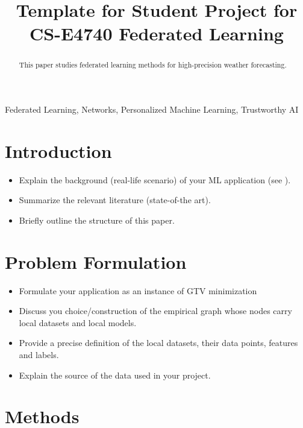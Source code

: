 \documentclass{article}
\title{Template for Student Project for \\ 
	CS-E4740 Federated Learning}
\begin{document}
%
\maketitle
%
\begin{abstract}
This paper studies federated learning methods for high-precision weather forecasting. 
\end{abstract}
%
\begin{keywords}
Federated Learning, Networks, Personalized Machine Learning, Trustworthy AI 
\end{keywords}
%
\section{Introduction}
\label{sec:intro}
\begin{itemize}
\item Explain the background (real-life scenario) of your ML application (see \cite[Ch. 2]{MLBasics}).  
\item Summarize the relevant literature (state-of-the art). 
\item Briefly outline the structure of this paper. 
\end{itemize}


\section{Problem Formulation}
\label{sec:pf}

\begin{itemize} 
\item Formulate your application as an instance of GTV minimization \cite[Sec. 7]{lecnotesfl} 
\item Discuss you choice/construction of the empirical graph whose nodes carry local datasets and local models. 
\item Provide a precise definition of the local datasets, their data points, features and labels. 
\item Explain the source of the data used in your project. 
\end{itemize} 

\section{Methods} 
\label{sec_methods} 
\end{document}
